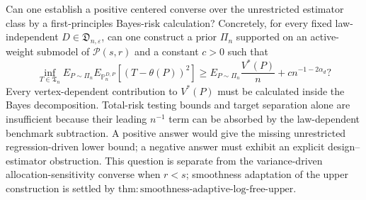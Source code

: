 Can one establish a positive centered converse over the unrestricted estimator class by a first-principles Bayes-risk calculation?  Concretely, for every fixed law-independent \(D\in\mathfrak D_{n,\varepsilon}\), can one construct a prior \(\Pi_n\) supported on an active-weight submodel of \(\mathcal P(s,r)\) and a constant \(c>0\) such that
\[
\inf_{T\in\mathfrak T_n}
E_{P\sim\Pi_n}E_{\mathbb P_n^{D,P}}[(T-\theta(P))^2]
\geq E_{P\sim\Pi_n}\frac{V^*(P)}n
+c n^{-1-2\alpha_d}?
\]
Every vertex-dependent contribution to \(V^*(P)\) must be calculated inside the Bayes decomposition.  Total-risk testing bounds and target separation alone are insufficient because their leading \(n^{-1}\) term can be absorbed by the law-dependent benchmark subtraction.  A positive answer would give the missing unrestricted regression-driven lower bound; a negative answer must exhibit an explicit design--estimator obstruction.  This question is separate from the variance-driven allocation-sensitivity converse when \(r<s\); smoothness adaptation of the upper construction is settled by \(\mathrm{thm{:}smoothness\text{-}adaptive\text{-}log\text{-}free\text{-}upper}\).